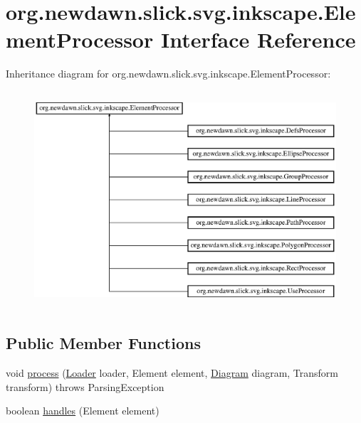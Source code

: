 \hypertarget{interfaceorg_1_1newdawn_1_1slick_1_1svg_1_1inkscape_1_1_element_processor}{}\section{org.\+newdawn.\+slick.\+svg.\+inkscape.\+Element\+Processor Interface Reference}
\label{interfaceorg_1_1newdawn_1_1slick_1_1svg_1_1inkscape_1_1_element_processor}
Inheritance diagram for org.\+newdawn.\+slick.\+svg.\+inkscape.\+Element\+Processor\+:\begin{figure}[H]
\begin{center}
\leavevmode
\includegraphics[height=8.102894cm]{interfaceorg_1_1newdawn_1_1slick_1_1svg_1_1inkscape_1_1_element_processor}
\end{center}
\end{figure}
\subsection*{Public Member Functions}
\begin{DoxyCompactItemize}
\item 
void \mbox{\hyperlink{interfaceorg_1_1newdawn_1_1slick_1_1svg_1_1inkscape_1_1_element_processor_acd170a9e1119481edae885780db59a2e}{process}} (\mbox{\hyperlink{interfaceorg_1_1newdawn_1_1slick_1_1svg_1_1_loader}{Loader}} loader, Element element, \mbox{\hyperlink{classorg_1_1newdawn_1_1slick_1_1svg_1_1_diagram}{Diagram}} diagram, Transform transform)  throws Parsing\+Exception
\item 
boolean \mbox{\hyperlink{interfaceorg_1_1newdawn_1_1slick_1_1svg_1_1inkscape_1_1_element_processor_ae95bbf21a67c52aff02cf09259c554a3}{handles}} (Element element)
\end{DoxyCompactItemize}


